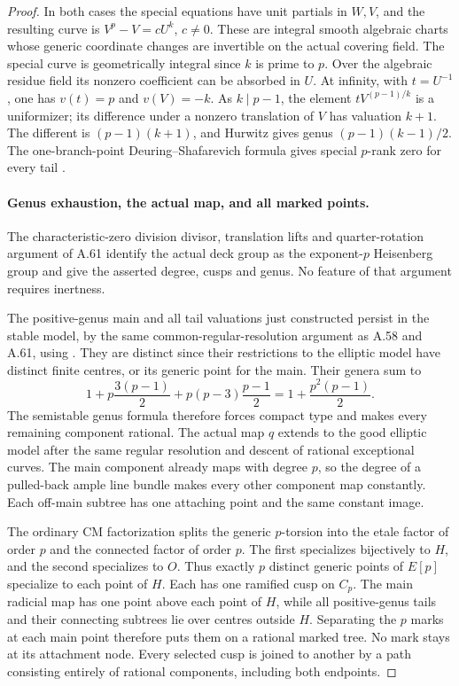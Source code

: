 \begin{proof}
In both cases the special equations have unit
partials in \(W,V\), and the resulting curve is
\(V^p-V=cU^k\), \(c\ne0\). These are integral
smooth algebraic charts whose generic coordinate
changes are invertible on the actual covering field.
The special curve is geometrically integral since
\(k\) is prime to \(p\). Over the algebraic residue
field its nonzero coefficient can be absorbed in \(U\).
At infinity, with \(t=U^{-1}\), one has
\(v(t)=p\) and \(v(V)=-k\). As \(k\mid p-1\),
the element \(tV^{(p-1)/k}\) is a uniformizer;
its difference under a nonzero translation of \(V\)
has valuation \(k+1\). The different is
\((p-1)(k+1)\), and Hurwitz gives genus
\((p-1)(k-1)/2\). The one-branch-point
Deuring--Shafarevich formula gives special \(p\)-rank
zero for every tail \cite[Corollary 1.8]{fghCrew1984}.

\paragraph{Genus exhaustion, the actual map, and all marked points.}
The characteristic-zero division divisor, translation
lifts and quarter-rotation argument of A.61 identify
the actual deck group as the exponent-\(p\) Heisenberg
group and give the asserted degree, cusps and genus.
No feature of that argument requires inertness.

The positive-genus main and all tail valuations just
constructed persist in the stable model, by the same
common-regular-resolution argument as A.58 and A.61,
using \cite[Theorem 9.2.2, Remark 9.2.6 and
Theorem 9.3.21]{fghLiu}. They are distinct since their
restrictions to the elliptic model have distinct
finite centres, or its generic point for the main.
Their genera sum to
\[
 1+p\frac{3(p-1)}2+p(p-3)\frac{p-1}2
                  =1+\frac{p^2(p-1)}2.                \tag{A.62.17}
\]
The semistable genus formula therefore forces compact
type and makes every remaining component rational.
The actual map \(q\) extends to the good elliptic
model after the same regular resolution and descent
of rational exceptional curves. The main component
already maps with degree \(p\), so the degree of a
pulled-back ample line bundle makes every other
component map constantly. Each off-main subtree
has one attaching point and the same constant image.

The ordinary CM factorization splits the generic
\(p\)-torsion into the etale factor of order \(p\)
and the connected factor of order \(p\). The first
specializes bijectively to \(H\), and the second
specializes to \(O\). Thus exactly \(p\) distinct
generic points of \(E[p]\) specialize to each point
of \(H\). Each has one ramified cusp on \(C_p\).
The main radicial map has one point above each
point of \(H\), while all positive-genus tails
and their connecting subtrees lie over centres
outside \(H\). Separating the \(p\) marks at
each main point therefore puts them on a rational
marked tree. No mark stays at its attachment node.
Every selected cusp is joined to another by a path
consisting entirely of rational components, including
both endpoints.


\end{proof}
